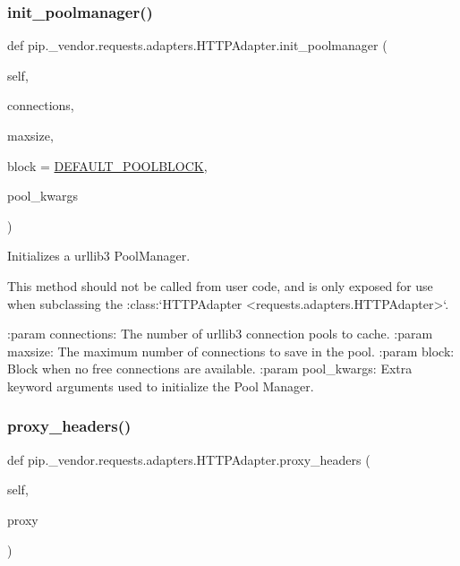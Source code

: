 \subsubsection{\texorpdfstring{init\+\_\+poolmanager()}{init\_poolmanager()}}
{\footnotesize\ttfamily def pip.\+\_\+vendor.\+requests.\+adapters.\+H\+T\+T\+P\+Adapter.\+init\+\_\+poolmanager (\begin{DoxyParamCaption}\item[{}]{self,  }\item[{}]{connections,  }\item[{}]{maxsize,  }\item[{}]{block = {\ttfamily \hyperlink{namespacepip_1_1__vendor_1_1requests_1_1adapters_a1a319251a1ddc3b53aa48239822097c1}{D\+E\+F\+A\+U\+L\+T\+\_\+\+P\+O\+O\+L\+B\+L\+O\+CK}},  }\item[{}]{pool\+\_\+kwargs }\end{DoxyParamCaption})}

\begin{DoxyVerb}Initializes a urllib3 PoolManager.

This method should not be called from user code, and is only
exposed for use when subclassing the
:class:`HTTPAdapter <requests.adapters.HTTPAdapter>`.

:param connections: The number of urllib3 connection pools to cache.
:param maxsize: The maximum number of connections to save in the pool.
:param block: Block when no free connections are available.
:param pool_kwargs: Extra keyword arguments used to initialize the Pool Manager.
\end{DoxyVerb}
 \mbox{\label{classpip_1_1__vendor_1_1requests_1_1adapters_1_1HTTPAdapter_a10a2069cfdc982d7d30efcf8327e27e6}} 
\subsubsection{\texorpdfstring{proxy\+\_\+headers()}{proxy\_headers()}}
{\footnotesize\ttfamily def pip.\+\_\+vendor.\+requests.\+adapters.\+H\+T\+T\+P\+Adapter.\+proxy\+\_\+headers (\begin{DoxyParamCaption}\item[{}]{self,  }\item[{}]{proxy }\end{DoxyParamCaption})}

